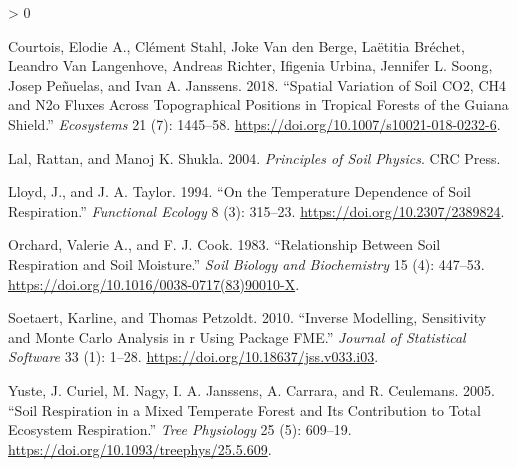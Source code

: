 \documentclass[
]{article}
\newlength{\cslhangindent}
\newenvironment{CSLReferences}[2] %
 {%
  \setlength{\parindent}{0pt}
  \ifodd #1 \everypar{\setlength{\hangindent}{\cslhangindent}}\ignorespaces\fi
  \ifnum #2 > 0
  \setlength{\parskip}{#2\baselineskip}
  \fi
 }%
 {}
\begin{document}
\hypertarget{refs}{}
\begin{CSLReferences}{1}{0}
\leavevmode\hypertarget{ref-courtois_spatial_2018}{}%
Courtois, Elodie A., Clément Stahl, Joke Van den Berge, Laëtitia Bréchet, Leandro Van Langenhove, Andreas Richter, Ifigenia Urbina, Jennifer L. Soong, Josep Peñuelas, and Ivan A. Janssens. 2018. {``Spatial Variation of Soil {CO}2, {CH}4 and N2o Fluxes Across Topographical Positions in Tropical Forests of the Guiana Shield.''} \emph{Ecosystems} 21 (7): 1445--58. \url{https://doi.org/10.1007/s10021-018-0232-6}.

\leavevmode\hypertarget{ref-lal_principles_2004}{}%
Lal, Rattan, and Manoj K. Shukla. 2004. \emph{Principles of Soil Physics}. {CRC} Press.

\leavevmode\hypertarget{ref-lloyd_temperature_1994}{}%
Lloyd, J., and J. A. Taylor. 1994. {``On the Temperature Dependence of Soil Respiration.''} \emph{Functional Ecology} 8 (3): 315--23. \url{https://doi.org/10.2307/2389824}.

\leavevmode\hypertarget{ref-orchard_relationship_1983}{}%
Orchard, Valerie A., and F. J. Cook. 1983. {``Relationship Between Soil Respiration and Soil Moisture.''} \emph{Soil Biology and Biochemistry} 15 (4): 447--53. \url{https://doi.org/10.1016/0038-0717(83)90010-X}.

\leavevmode\hypertarget{ref-soetaert_inverse_2010}{}%
Soetaert, Karline, and Thomas Petzoldt. 2010. {``Inverse Modelling, Sensitivity and Monte Carlo Analysis in r Using Package {FME}.''} \emph{Journal of Statistical Software} 33 (1): 1--28. \url{https://doi.org/10.18637/jss.v033.i03}.

\leavevmode\hypertarget{ref-yuste_soil_2005}{}%
Yuste, J. Curiel, M. Nagy, I. A. Janssens, A. Carrara, and R. Ceulemans. 2005. {``Soil Respiration in a Mixed Temperate Forest and Its Contribution to Total Ecosystem Respiration.''} \emph{Tree Physiology} 25 (5): 609--19. \url{https://doi.org/10.1093/treephys/25.5.609}.

\end{CSLReferences}
\end{document}
